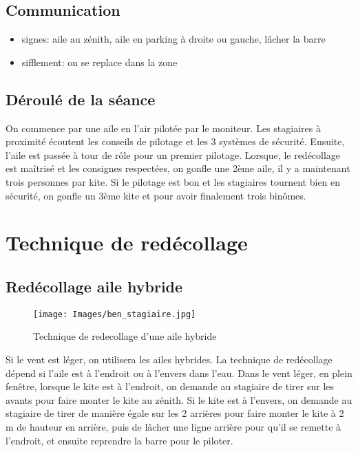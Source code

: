 \documentclass[11pt,a4paper]{report}
\begin{document}
\section{Communication}
\begin{itemize}
\item signes: aile au zénith, aile en parking à droite ou gauche, lâcher la barre
\item sifflement: on se replace dans la zone
\end{itemize}
\section{Déroulé de la séance}
On commence par une aile en l'air pilotée par le moniteur.
Les stagiaires à proximité écoutent les conseils de pilotage et les 3 systèmes
de sécurité.
Ensuite, l'aile est passée à tour de rôle pour un premier pilotage.
Lorsque, le redécollage est maîtrisé et les consignes respectées, 
on gonfle une 2ème aile, il y a maintenant trois personnes par kite.
Si le pilotage est bon et les stagiaires tournent bien en sécurité,
on gonfle un 3ème kite et pour avoir finalement trois binômes.


\chapter{Technique de redécollage \label{redecollage}}
\section{Redécollage aile hybride}
\begin{figure}[h]
\centering
\texttt{[image: Images/ben\_stagiaire.jpg]}
\caption{Technique de redecollage d'une aile hybride} 
\end{figure}

Si le vent est léger, on utilisera les ailes hybrides. La technique
de redécollage dépend si l'aile est à l'endroit ou à l'envers dans l'eau.
Dans le vent léger, en plein fen\^etre, lorsque
le kite est à l'endroit, on demande au stagiaire de tirer  sur les avants
pour faire monter le kite au zénith. 
Si le kite est à l'envers, on demande au stagiaire de tirer de manière
égale sur les 2 arrières pour faire monter le kite à 2 m de hauteur en arrière, 
puis de lâcher une ligne arrière pour qu'il se remette à l'endroit,
et ensuite reprendre la barre pour le piloter.
\end{document}
